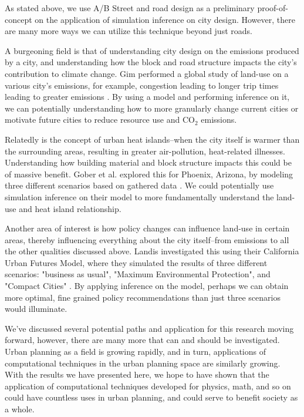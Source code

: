 \documentclass[]{article}
\begin{document}
As stated above, we use A/B Street and road design as a preliminary
proof-of-concept on the application of simulation inference on city
design. However, there are many more ways we can utilize this technique
beyond just roads.

A burgeoning field is that of understanding city design on the emissions
produced by a city, and understanding how the block and road structure
impacts the city's contribution to climate change. Gim performed a global 
study of land-use on a various city's emissions, for example, congestion 
leading to longer trip times leading to greater emissions \cite{doi:10.1080/15568318.2021.1901163}.
By using a model and performing inference on it, we can potentially 
understanding how to more granularly change current cities or motivate 
future cities to reduce resource use and CO$_2$ emissions.

Relatedly is the concept of urban heat islands--when the city itself is
warmer than the surrounding areas, resulting in greater air-pollution,
heat-related illnesses. Understanding how building material and block
structure impacts this could be of massive benefit. Gober et al. explored this 
for Phoenix, Arizona, by modeling three different scenarios based on gathered 
data \cite{doi:10.1080/01944360903433113}. We could potentially use simulation 
inference on their model to more fundamentally understand the land-use and heat island 
relationship.

Another area of interest is how policy changes can influence land-use in certain 
areas, thereby influencing everything about the city itself--from emissions to all 
the other qualities discussed above. Landis investigated this using their California 
Urban Futures Model, where they simulated the results of three different scenarios: 
"business as usual", "Maximum Environmental Protection", and "Compact Cities" \cite{doi:10.1080/01944369508975656}.
 By applying inference on the model, perhaps we can obtain more optimal, fine grained 
 policy recommendations than just three scenarios would illuminate.

We've discussed several potential paths and application for this research moving 
forward, however, there are many more that can and should be investigated. Urban planning 
as a field is growing rapidly, and in turn, applications of computational techniques in 
the urban planning space are similarly growing. With the results we have presented here, 
we hope to have shown that the application of computational techniques developed for physics, 
math, and so on could have countless uses in urban planning, and could serve to 
benefit society as a whole. 
\end{document}
